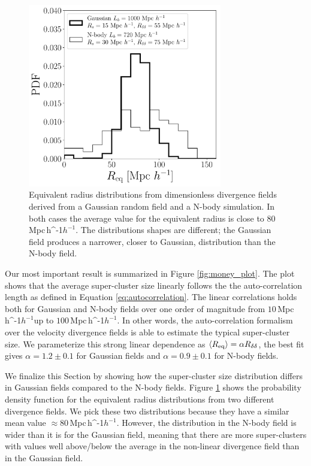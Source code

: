 \documentclass[usenatbib]{mnras}
\newcommand{\Mpch}{\,{\rm Mpc}\,\ifmmode h^{-1}\else $h^{-1}$\fi}
\begin{document}
 
\begin{figure}
    \centering
    \includegraphics[width=240pt]{sizes_histogram.pdf}
    \caption{Equivalent radius distributions from dimensionless divergence fields derived from a Gaussian random field and a N-body simulation.
    In both cases the average value for the equivalent radius is close to $80$\Mpch. 
    The distributions shapes are different; the Gaussian field produces a narrower, closer to Gaussian, distribution than the N-body field. }  
    \label{fig:Nclusters}
\end{figure}


Our most important result is summarized in Figure \ref{fig:money_plot}.
The plot shows that 
the average super-cluster size linearly follows the the auto-correlation length as defined in Equation \ref{eq:autocorrelation}.
The linear correlations holds both for Gaussian and N-body fields over one order of magnitude from $10$\Mpch up to $100$\Mpch.
In other words, the auto-correlation formalism over the velocity divergence fields is able to estimate the typical super-cluster size.
We parameterize this strong linear dependence  as 
$\langle R_{\rm{eq}}\rangle=\alpha R_{\delta\delta}$, the best fit gives $\alpha=1.2\pm0.1$ for Gaussian fields and $\alpha=0.9\pm 0.1$ for N-body fields.
    
We finalize this Section by showing how the super-cluster size distribution differs in Gaussian fields compared to the N-body fields.
Figure \ref{fig:Nclusters} shows the probability density function for the equivalent radius distributions from two different divergence fields.
We pick these two distributions because they have a similar mean value $\approx80$\Mpch. 
However, the distribution in the N-body field is wider than it is for the Gaussian field, meaning that there are more super-clusters with values well above/below the average in the non-linear divergence field than in the Gaussian field. 
\end{document}
